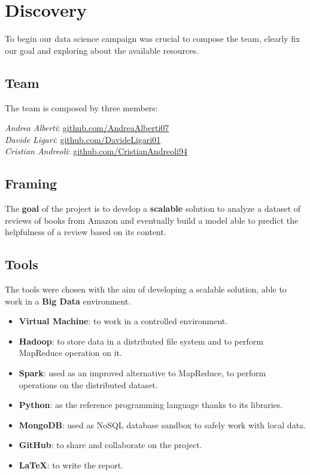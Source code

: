 \section{Discovery}
To begin our data science campaign was crucial to compose the team, clearly fix our goal and exploring about the available resources.

\subsection*{Team}
The team is composed by three members:

\noindent
\textit{Andrea Alberti}: \href{https://github.com/AndreaAlberti07}{github.com/AndreaAlberti07}\\
\textit{Davide Ligari}: \href{https://github.com/DavideLigari01}{github.com/DavideLigari01}\\
\textit{Cristian Andreoli}: \href{https://github.com/CristianAndreoli94}{github.com/CristianAndreoli94}\\

\subsection*{Framing}
The \textbf{goal} of the project is to develop a \textbf{scalable} solution to analyze a dataset of reviews of books from Amazon and
eventually build a model able to predict the helpfulness of a review based on its content.

\subsection*{Tools}
The tools were chosen with the aim of developing a scalable solution, able to work in a \textbf{Big Data} environment.

\begin{itemize}[leftmargin=*, noitemsep]
    \item \textbf{Virtual Machine}: to work in a controlled environment.
    \item \textbf{Hadoop}: to store data in a distributed file system and to perform MapReduce operation on it.
    \item \textbf{Spark}: used as an improved alternative to MapReduce, to perform operations on the distributed dataset.
    \item \textbf{Python}: as the reference programming language thanks to its libraries.
    \item \textbf{MongoDB}: used as NoSQL database sandbox to safely work with local data.
    \item \textbf{GitHub}: to share and collaborate on the project.
    \item \textbf{LaTeX}: to write the report.
\end{itemize}




